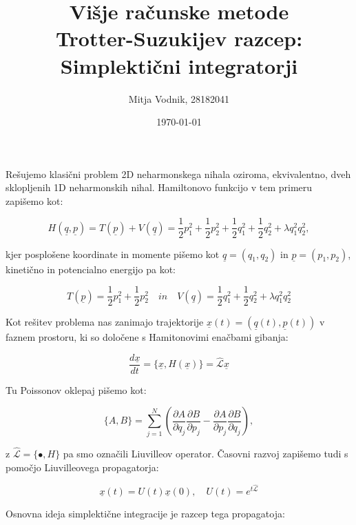 \documentclass[a4paper]{article}
\newcommand{\der}[2]{\frac{d#1}{d#2}}
\newcommand{\pder}[2]{\frac{\partial#1}{\partial#2}}
\newcommand{\half}{\frac{1}{2}}
\newcommand{\q}{\underline{q}}
\newcommand{\p}{\underline{p}}
\newcommand{\x}{\underline{x}}
\newcommand{\liu}{\hat{\mathcal{L}}}
\begin{document}
    \title{\sc\large Višje računske metode\\
		\bigskip
		\bf\Large Trotter-Suzukijev razcep: Simplektični integratorji}
	\author{Mitja Vodnik, 28182041}
	\date{\today}
	\maketitle

    Rešujemo klasični problem 2D neharmonskega nihala oziroma, ekvivalentno, dveh sklopljenih 1D neharmonskih nihal. Hamiltonovo funkcijo v tem
    primeru zapišemo kot:

    \begin{equation}\label{hamilton}
        H(\q, \p) = T(\p) + V(\q) = \half p_1^2 + \half p_2^2 + \half q_1^2 + \half q_2^2 + \lambda q_1^2 q_2^2,
    \end{equation}

    kjer posplošene koordinate in momente pišemo kot $\q = (q_1, q_2)$ in $\p = (p_1, p_2)$, kinetično in potencialno energijo pa kot:

    \begin{equation}\label{energies}
        T(\p) = \half p_1^2 + \half p_2^2 \quad in \quad V(\q) = \half q_1^2 + \half q_2^2 + \lambda q_1^2 q_2^2
    \end{equation}

    Kot rešitev problema nas zanimajo trajektorije $\x(t) = (\q(t), \p(t))$ v faznem prostoru, ki so določene s Hamitonovimi enačbami gibanja:

    \begin{equation}\label{equationsOfMotion}
        \der{\x}{t} = \{\x, H(\x)\} = \liu \x
    \end{equation}

    Tu Poissonov oklepaj pišemo kot:

        \begin{equation}\label{poisson}
        \{A, B\} = \sum_{j = 1}^{N} \left( \pder{A}{q_j}\pder{B}{p_j} - \pder{A}{p_j}\pder{B}{q_j} \right),
    \end{equation}

    z $\liu = \{\bullet, H\}$ pa smo označili Liuvilleov operator. Časovni razvoj zapišemo tudi s pomočjo Liuvilleovega propagatorja:

    \begin{equation}\label{propagator}
        \x(t) = U(t)\x(0), \quad U(t) = e^{t\liu}
    \end{equation}

    Osnovna ideja simplektične integracije je razcep tega propagatoja:
\end{document}
